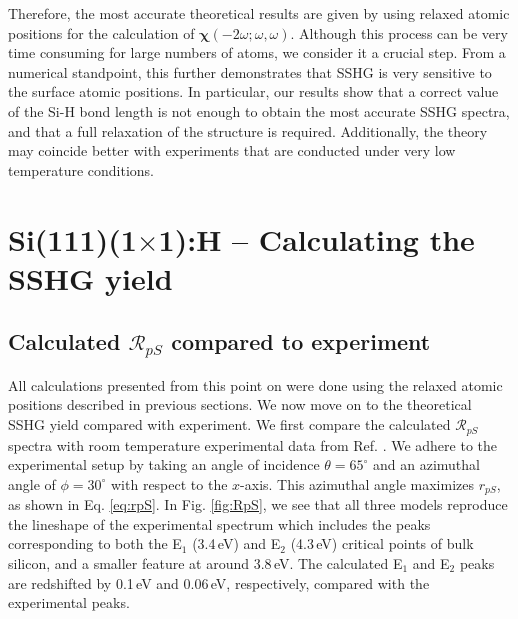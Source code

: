 \documentclass[11pt]{book}
\begin{document}
Therefore, the most accurate theoretical results are given by using relaxed atomic positions for the calculation of $\boldsymbol{\chi}(-2\omega;\omega,\omega)$. Although this process can be very time consuming for large numbers of atoms, we consider it a crucial step. From a numerical standpoint, this further demonstrates that SSHG is very sensitive to the surface atomic positions. In particular, our results show that a correct value of the Si-H bond length is not enough to obtain the most accurate SSHG spectra, and that a full relaxation of the structure is required. Additionally, the theory may coincide better with experiments that are conducted under very low temperature conditions.



\section{\texorpdfstring{Si(111)(1$\times$1):H}{Si(111)(1x1):H} -- Calculating the SSHG yield}



\subsection{Calculated \texorpdfstring{$\mathcal{R}_{pS}$}{RpS} compared to experiment}\label{sec: RpS}

All calculations presented from this point on were done using the relaxed atomic positions described in previous sections. We now move on to the theoretical SSHG yield compared with experiment. We first compare the calculated $\mathcal{R}_{pS}$ spectra with room temperature experimental data from Ref. \cite{mejiaPRB02}. We adhere to the experimental setup by taking an angle of incidence $\theta=65^{\circ}$ and an azimuthal angle of $\phi=30^\circ$ with respect to the $x$-axis. This azimuthal angle maximizes $r_{pS}$, as shown in Eq. \eqref{eq:rpS}. In Fig. \ref{fig:RpS}, we see that all three models reproduce the lineshape of the experimental spectrum which includes the peaks corresponding to both the E$_{1}$ (3.4\,eV) and E$_{2}$ (4.3\,eV) critical points of bulk silicon, and a smaller feature at around 3.8\,eV. The calculated E$_{1}$ and E$_{2}$ peaks are redshifted by 0.1\,eV and 0.06\,eV, respectively, compared with the experimental peaks.
\end{document}
